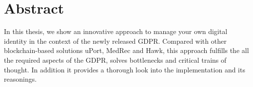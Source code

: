 \chapter*{Abstract}
\label{cha:abstract}

In this thesis, we show an innovative approach to manage your own digital identity in the context
of the newly released GDPR. Compared with other blockchain-based solutions uPort, MedRec and Hawk,
this approach fulfills the all the required aspects of the GDPR, solves bottlenecks and critical
trains of thought.
In addition it provides a thorough look into the implementation and its reasonings.


